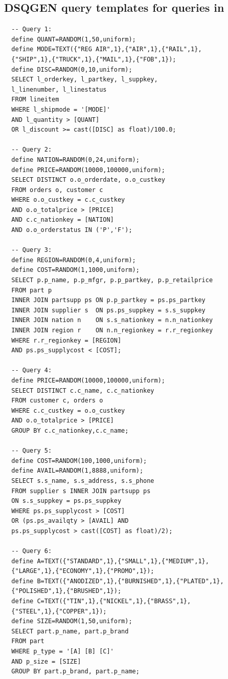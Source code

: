 \begin{toappendix}
	\section{DSQGEN query templates for queries in \qcust}
	\begin{verbatim}
  -- Query 1:
  define QUANT=RANDOM(1,50,uniform);
  define MODE=TEXT({"REG AIR",1},{"AIR",1},{"RAIL",1},
  {"SHIP",1},{"TRUCK",1},{"MAIL",1},{"FOB",1});
  define DISC=RANDOM(0,10,uniform);
  SELECT l_orderkey, l_partkey, l_suppkey,
  l_linenumber, l_linestatus
  FROM lineitem
  WHERE l_shipmode = '[MODE]'
  AND l_quantity > [QUANT]
  OR l_discount >= cast([DISC] as float)/100.0;

  -- Query 2:
  define NATION=RANDOM(0,24,uniform);
  define PRICE=RANDOM(10000,100000,uniform);
  SELECT DISTINCT o.o_orderdate, o.o_custkey
  FROM orders o, customer c
  WHERE o.o_custkey = c.c_custkey
  AND o.o_totalprice > [PRICE]
  AND c.c_nationkey = [NATION]
  AND o.o_orderstatus IN ('P','F');

  -- Query 3:
  define REGION=RANDOM(0,4,uniform);
  define COST=RANDOM(1,1000,uniform);
  SELECT p.p_name, p.p_mfgr, p.p_partkey, p.p_retailprice
  FROM part p
  INNER JOIN partsupp ps ON p.p_partkey = ps.ps_partkey
  INNER JOIN supplier s  ON ps.ps_suppkey = s.s_suppkey
  INNER JOIN nation n    ON s.s_nationkey = n.n_nationkey
  INNER JOIN region r    ON n.n_regionkey = r.r_regionkey
  WHERE r.r_regionkey = [REGION]
  AND ps.ps_supplycost < [COST];

  -- Query 4:
  define PRICE=RANDOM(10000,100000,uniform);
  SELECT DISTINCT c.c_name, c.c_nationkey
  FROM customer c, orders o
  WHERE c.c_custkey = o.o_custkey
  AND o.o_totalprice > [PRICE]
  GROUP BY c.c_nationkey,c.c_name;

  -- Query 5:
  define COST=RANDOM(100,1000,uniform);
  define AVAIL=RANDOM(1,8888,uniform);
  SELECT s.s_name, s.s_address, s.s_phone
  FROM supplier s INNER JOIN partsupp ps
  ON s.s_suppkey = ps.ps_suppkey
  WHERE ps.ps_supplycost > [COST]
  OR (ps.ps_availqty > [AVAIL] AND
  ps.ps_supplycost > cast([COST] as float)/2);

  -- Query 6:
  define A=TEXT({"STANDARD",1},{"SMALL",1},{"MEDIUM",1},
  {"LARGE",1},{"ECONOMY",1},{"PROMO",1});
  define B=TEXT({"ANODIZED",1},{"BURNISHED",1},{"PLATED",1},
  {"POLISHED",1},{"BRUSHED",1});
  define C=TEXT({"TIN",1},{"NICKEL",1},{"BRASS",1},
  {"STEEL",1},{"COPPER",1});
  define SIZE=RANDOM(1,50,uniform);
  SELECT part.p_name, part.p_brand
  FROM part
  WHERE p_type = '[A] [B] [C]'
  AND p_size = [SIZE]
  GROUP BY part.p_brand, part.p_name;


\end{verbatim}
\end{toappendix}
